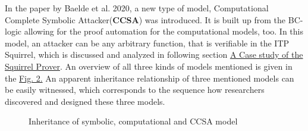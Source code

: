 \documentclass[conference]{IEEEtran}
\begin{document}
In the paper by Baelde et al. 2020\cite{Squirrel}, a new type of model, Computational Complete Symbolic Attacker(\textbf{CCSA}) was introduced. It is built up from the BC-logic allowing for the proof automation for the computational models, too. In this model, an attacker can be any arbitrary function, that is verifiable in the ITP Squirrel, which is discussed and analyzed in following section \hyperref[sec:squirrel]{A Case study of the Squirrel Prover}. An overview of all three kinds of models mentioned is given in the \hyperref[figure:2]{Fig. 2.} An apparent inheritance relationship of three mentioned models can be easily witnessed, which corresponds to the sequence how researchers discovered and designed these three models.
\begin{figure}
\centering
{}
\caption{Inheritance of symbolic, computational and CCSA model}\label{figure:2}
\end{figure}
\end{document}
